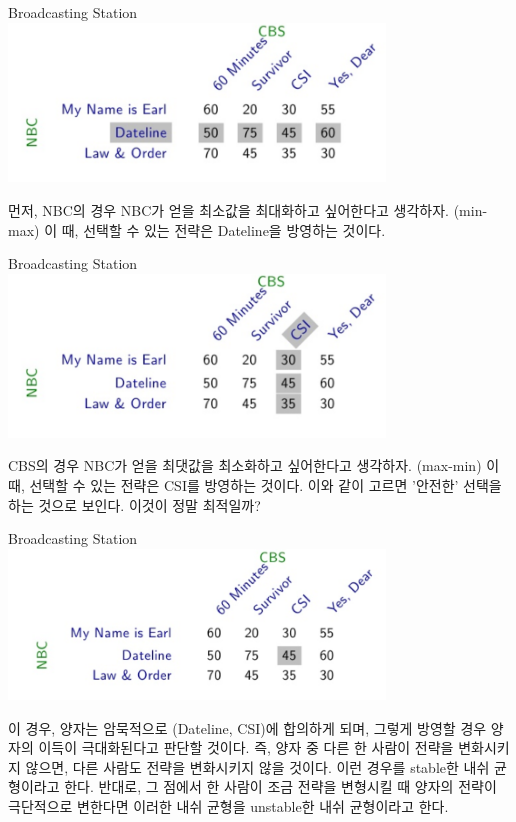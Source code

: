\documentclass{beamer}
\begin{document}
\begin{frame}{Broadcasting Station }
\includegraphics[width=10cm,keepaspectratio]{dateline}

먼저, NBC의 경우 NBC가 얻을 최소값을 최대화하고 싶어한다고 생각하자. (min-max)
이 때, 선택할 수 있는 전략은 Dateline을 방영하는 것이다. 

\end{frame}


\begin{frame}{Broadcasting Station }
\includegraphics[width=10cm,keepaspectratio]{csi}

CBS의 경우 NBC가 얻을 최댓값을 최소화하고 싶어한다고 생각하자. (max-min)
이 때, 선택할 수 있는 전략은 CSI를 방영하는 것이다. 이와 같이 고르면 '안전한' 선택을 하는 것으로 보인다. 이것이 정말 최적일까? 

\end{frame}

\begin{frame}{Broadcasting Station }
\includegraphics[width=10cm,keepaspectratio]{eq}

이 경우, 양자는 암묵적으로 (Dateline, CSI)에 합의하게 되며, 그렇게 방영할 경우 양자의 이득이 극대화된다고 판단할 것이다. 즉, 양자 중 다른 한 사람이 전략을 변화시키지 않으면, 다른 사람도 전략을 변화시키지 않을 것이다. 이런 경우를 stable한 내쉬 균형이라고 한다. 반대로, 그 점에서 한 사람이 조금 전략을 변형시킬 때 양자의 전략이 극단적으로 변한다면 이러한 내쉬 균형을 unstable한 내쉬 균형이라고 한다. 
\end{frame}
\end{document}
